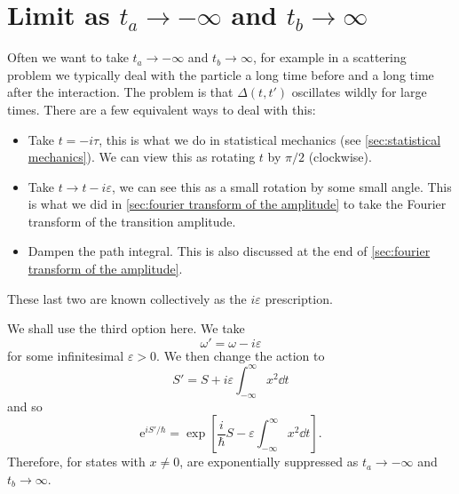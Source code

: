 \documentclass[fleqn]{NotesClass}
\newcommand*{\e}{\mathrm{e}}
\begin{document}
    \section{Limit as \texorpdfstring{\lowercase{\(t_a \to -\infty\)}}{ta to -infinity} and \texorpdfstring{\lowercase{\(t_b \to \infty\)}}{tb to infinity}}
    Often we want to take \(t_a \to -\infty\) and \(t_b \to \infty\), for example in a scattering problem we typically deal with the particle a long time before and a long time after the interaction.
    The problem is that \(\Delta(t, t')\) oscillates wildly for large times.
    There are a few equivalent ways to deal with this:
    \begin{itemize}
        \item Take \(t = -i\tau\), this is what we do in statistical mechanics (see \cref{sec:statistical mechanics}).
        We can view this as rotating \(t\) by \(\pi/2\) (clockwise).
        \item Take \(t \to t - i\varepsilon\), we can see this as a small rotation by some small angle.
        This is what we did in \cref{sec:fourier transform of the amplitude} to take the Fourier transform of the transition amplitude.
        \item Dampen the path integral.
        This is also discussed at the end of \cref{sec:fourier transform of the amplitude}.
    \end{itemize}
    These last two are known collectively as the \(i\varepsilon\) prescription.
    
    We shall use the third option here.
    We take
    \begin{equation}
        \omega' = \omega - i\varepsilon
    \end{equation}
    for some infinitesimal \(\varepsilon > 0\).
    We then change the action to
    \begin{equation}
        S' = S + i\varepsilon \int_{-\infty}^{\infty} x^2 \dd{t}
    \end{equation}
    and so
    \begin{equation}
        \e^{iS'/\hbar} = \exp\left[ \frac{i}{\hbar} S - \varepsilon\int_{-\infty}^{\infty} x^2 \dd{t} \right].
    \end{equation}
    Therefore, for states with \(x \ne 0\), are exponentially suppressed as \(t_a \to -\infty\) and \(t_b \to \infty\).
    
\end{document}
